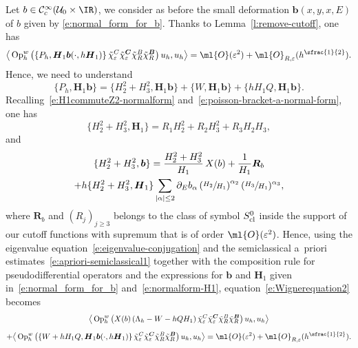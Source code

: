 \documentclass[10pt]{amsart}
\theoremstyle{plain}
\theoremstyle{definition}
\theoremstyle{remark}
\newcommand{\Op}{\operatorname{Op}}
\begin{document}
Let $b \in \mathcal{C}_c^\infty(\mathcal{U}_0 \times \IR)$, we consider as before the small deformation $\boldsymbol{b}(x,y,x,E)$ of $b$ given by \eqref{e:normal_form_for_b}. Thanks to Lemma~\ref{l:remove-cutoff}, one has
\begin{equation}\label{e:Wignerequation2}
\big \langle\Op_h^w\left(\left\{P_{h},\boldsymbol{H}_1 \boldsymbol{b}(\cdot,h \boldsymbol{H}_1)\right\}\tilde{\chi}_\varepsilon^C\tilde{\chi}_\varepsilon^{\boldsymbol{C}}\tilde{\chi}_R^B\tilde{\chi}_R^{\boldsymbol{B}}\right) u_h,u_h\big\rangle=\ml{O}(\varepsilon^2)+\ml{O}_{R,\varepsilon}(h^{\sfrac{1}{2}}).
\end{equation}
Hence, we need to understand
\begin{equation}%
\{P_h, \boldsymbol{H}_1 \boldsymbol{b} \}= \{H_2^2+H_3^2, \boldsymbol{H}_1 \boldsymbol{b}\}+\{ W , \boldsymbol{H}_1 \boldsymbol{b} \} + \{ h H_1 Q, \boldsymbol{H}_1 \boldsymbol{b} \}.
\end{equation}
Recalling~\eqref{e:H1commuteZ2-normalform} and~\eqref{e:poisson-bracket-a-normal-form}, one has
\[
\{ H_2^2+H_3^2,\boldsymbol{H}_1\}= R_1H_2^2+R_2H_3^2+R_3H_2H_3,
\]
and
\begin{multline*}
\{H_2^2+H_3^2,\boldsymbol{b}\}=\frac{H_2^2+H_3^2}{H_1}\,X(b)+\frac{1}{H_1}\boldsymbol{R}_b\\+h\{ H_2^2+H_3^2,\boldsymbol{H}_1\}\sum_{|\alpha|\leq 2}\partial_Eb_\alpha\left(\sfrac{H_2}{H_1}\right)^{\alpha_2}(\sfrac{H_3}{H_1})^{\alpha_3},
\end{multline*}
where $\boldsymbol{R}_b$ and $(R_j)_{j\geq 3}$ belongs to the class of symbol $S^0_{\textup{cl}}$ inside the support of our cutoff functions with supremum that is of order $\ml{O}(\varepsilon^2)$. Hence, using the eigenvalue equation~\eqref{e:eigenvalue-conjugation} and the semiclassical a~priori estimates~\eqref{e:apriori-semiclassical1} together with the composition rule for pseudodifferential operators and the expressions for $\boldsymbol{b}$ and $\boldsymbol{H}_1$ given in~\eqref{e:normal_form_for_b} and~\eqref{e:normalform-H1}, equation~\eqref{e:Wignerequation2} becomes
\begin{multline}\label{e:Wignerequation2bis}
\big \langle\Op_h^w\left(X(b)\left(\Lambda_h-W-hQH_1\right)\tilde{\chi}_\varepsilon^C\tilde{\chi}_\varepsilon^{\boldsymbol{C}}\tilde{\chi}_R^B\tilde{\chi}_R^{\boldsymbol{B}}\right) u_h,u_h\big\rangle\\[0.2cm] +
\big \langle\Op_h^w\left(\left\{W+hH_1Q,\boldsymbol{H}_1 \boldsymbol{b}(\cdot,h \boldsymbol{H}_1)\right\}\tilde{\chi}_\varepsilon^C\tilde{\chi}_\varepsilon^{\boldsymbol{C}}\tilde{\chi}_R^B\tilde{\chi}_R^{\boldsymbol{B}}\right) u_h,u_h\big\rangle=\ml{O}(\varepsilon^2)+\ml{O}_{R,\varepsilon}(h^{\sfrac{1}{2}}).
\end{multline}
\end{document}
